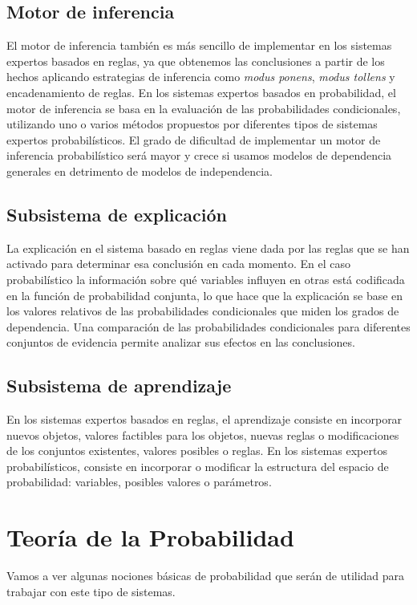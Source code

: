\documentclass{article}
\theoremstyle{definition_wo_parentheses}
\begin{document}
\subsection{Motor de inferencia}

El motor de inferencia también es más sencillo de implementar en los sistemas expertos basados en reglas, ya que obtenemos las conclusiones a partir de los hechos aplicando estrategias de inferencia como \textit{modus ponens}, \textit{modus tollens} y encadenamiento de reglas. En los sistemas expertos basados en probabilidad, el motor de inferencia se basa en la evaluación de las probabilidades condicionales, utilizando uno o varios métodos propuestos por diferentes tipos de sistemas expertos probabilísticos. El grado de dificultad de implementar un motor de inferencia probabilístico será mayor y crece si usamos modelos de dependencia generales en detrimento de modelos de independencia.

\subsection{Subsistema de explicación}

La explicación en el sistema basado en reglas viene dada por las reglas que se han activado para determinar esa conclusión en cada momento. En el caso probabilístico la información sobre qué variables influyen en otras está codificada en la función de probabilidad conjunta, lo que hace que la explicación se base en los valores relativos de las probabilidades condicionales que miden los grados de dependencia. Una comparación de las probabilidades condicionales para diferentes conjuntos de evidencia permite analizar sus efectos en las conclusiones.

\subsection{Subsistema de aprendizaje}

En los sistemas expertos basados en reglas, el aprendizaje consiste en incorporar nuevos objetos, valores factibles para los objetos, nuevas reglas o modificaciones de los conjuntos existentes, valores posibles o reglas. En los sistemas expertos probabilísticos, consiste en incorporar o modificar la estructura del espacio de probabilidad: variables, posibles valores o parámetros.

\section{Teoría de la Probabilidad}
Vamos a ver algunas nociones básicas de probabilidad que serán de utilidad para trabajar con este tipo de sistemas.
\end{document}
